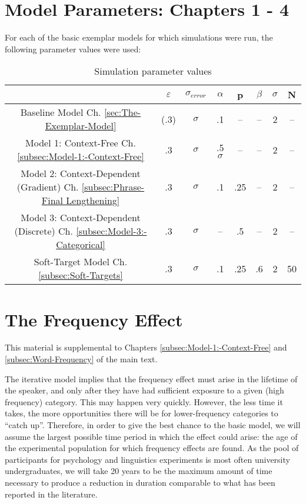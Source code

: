 \chapter{\label{chap:Appendix A}Model Parameters: Chapters 1 - 4}

For each of the basic exemplar models for which simulations were run,
the following parameter values were used:

\begin{table}[H]

\caption{Simulation parameter values}
\begin{tabular}{|c|c|c|c|c|c|c|c|}
\hline 
 & $\varepsilon$ & $\sigma_{error}$ & $\alpha$ & p & $\beta$ & $\sigma$ & N\tabularnewline
\hline 
\hline 
Baseline Model Ch. \ref{sec:The-Exemplar-Model} & (.3) & $\sigma$ & .1 & – & – & 2 & –\tabularnewline
\hline 
Model 1: Context-Free Ch. \ref{subsec:Model-1:-Context-Free} & .3 & $\sigma$ & .5$\sigma$ & – & – & 2 & –\tabularnewline
\hline 
Model 2: Context-Dependent (Gradient) Ch. \ref{subsec:Phrase-Final Lengthening} & .3 & $\sigma$ & .1 & .25 & – & 2 & –\tabularnewline
\hline 
Model 3: Context-Dependent (Discrete) Ch. \ref{subsec:Model-3:-Categorical} & .3 & $\sigma$ & – & .5 & – & 2 & –\tabularnewline
\hline 
Soft-Target Model Ch. \ref{subsec:Soft-Targets} & .3 & $\sigma$ & .1 & .25 & .6 & 2 & 50\tabularnewline
\hline 
\end{tabular}

\end{table}


\chapter{\label{chap:Appendix B}The Frequency Effect}

This material is supplemental to Chapters \ref{subsec:Model-1:-Context-Free}
and \ref{subsec:Word-Frequency} of the main text.

The iterative model implies that the frequency effect must arise in
the lifetime of the speaker, and only after they have had sufficient
exposure to a given (high frequency) category. This may happen very
quickly. However, the less time it takes, the more opportunities there
will be for lower-frequency categories to “catch up”. Therefore,
in order to give the best chance to the basic model, we will assume
the largest possible time period in which the effect could arise:
the age of the experimental population for which frequency effects
are found. As the pool of participants for psychology and linguistics
experiments is most often university undergraduates, we will take
20 years to be the maximum amount of time necessary to produce a reduction
in duration comparable to what has been reported in the literature.

